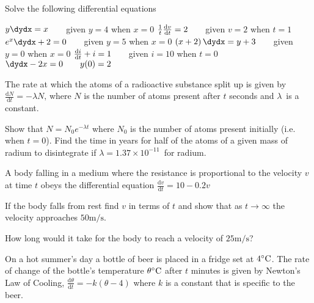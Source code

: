 \begin{Exercise}[title={Separable Equations},label=exSepEqns]
	\Question Solve the following differential equations  
	\begin{tasks}
		\task  $y \dydx =x\text{\quad \quad }$given $y =4$ when $x =0$ %
		\task $\frac{1}{t} \frac{\mathrm{d} v}{\mathrm{d} t} =2\text{\quad \quad }$given $v =2$ when $t =1$ %
		\task $e^{x} \dydx +2 =0\text{\quad \quad }$given $y =5$ when $x =0$ %
		\task $\left (x +2\right ) \dydx =y +3\text{\quad \quad }$given $y =0$ when $x =0$ %
		\task $\frac{\mathrm{d} i}{\mathrm{d} t} +i =1\text{\quad \quad }$given $i =10$ when $t =0$ %
		\task $\dydx -2 x =0\text{\quad \quad }y (0) =2$ %
	\end{tasks}
	

\Question The rate at which the atoms of a radioactive substance split up is given by $\frac{\mathrm{d} N}{\mathrm{d} t} = -\lambda  N\text{,}$ where $N$ is the number of atoms present after $t$ seconds and $\lambda $\ is a constant. 
\begin{tasks}
	\task Show that $N =N_{0} e^{ -\lambda  t}$ where $N_{0}$ is the number of atoms present initially (i.e. when $t =0$). 
	\task Find the time in years for half of the atoms of a given mass of
	radium to disintegrate if $\lambda  =1.37 \times 10^{ -11}$\ for radium. 
\end{tasks}

\Question A body falling in a medium where the resistance is proportional to the velocity $v$ at time $t$ obeys the differential equation $\frac{\mathrm{d} v}{\mathrm{d} t} =10 -0.2 v$ 
\begin{tasks}
	\task If the body falls from rest find $v$ in terms of $t$ and show that as $t \rightarrow \infty $ the velocity approaches $50 \mathrm{m}/\mbox{s}$. 
	
	\task How long would it take for the body to reach a velocity of $25 \mathrm{m}/\mbox{s}$? \end{tasks}

\Question On a hot summer's day a bottle of beer is placed in a fridge set at $4 \mbox{{\ensuremath{{}^\circ}}C}$.  The rate of change of the bottle's temperature $\theta  \mbox{{\ensuremath{{}^\circ}}C}$ after $t$ minutes is given by Newton's Law of Cooling, $\frac{\mathrm{d} \theta }{\mathrm{d} t} = -k \left (\theta  -4\right )$ where $k$ is a constant that is specific to the beer. 


\end{Exercise}
